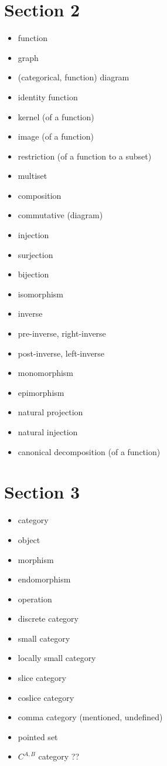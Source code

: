 \section*{Section 2}

\begin{itemize}
	\item function
	\item graph
	\item (categorical, function) diagram
	\item identity function
	\item kernel (of a function)
	\item image (of a function)
	\item restriction (of a function to a subset)
	\item multiset
	\item composition
	\item commutative (diagram)
	\item injection
	\item surjection
	\item bijection
	\item isomorphism
	\item inverse
	\item pre-inverse, right-inverse
	\item post-inverse, left-inverse
	\item monomorphism
	\item epimorphism
	\item natural projection
	\item natural injection
	\item canonical decomposition (of a function)
\end{itemize}


\section*{Section 3}

\begin{itemize}
	\item category
	\item object
	\item morphism
	\item endomorphism
	\item operation
	\item discrete category
	\item small category
	\item locally small category
	\item slice category
	\item coslice category
	\item comma category (mentioned, undefined)
	\item pointed set
	\item $C^{A, B}$ category ??
\end{itemize}
